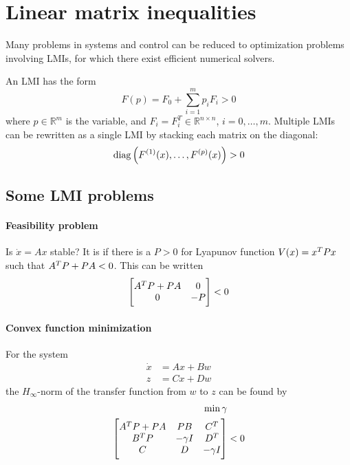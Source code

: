 \section{Linear matrix inequalities}
Many problems in systems and control can be reduced to optimization problems involving LMIs, for which there exist efficient numerical solvers.

An LMI has the form
%
\begin{equation}
  F(p) = F_0 + \sum_{i=1}^m p_i F_i > 0
\end{equation}
%
where $p \in \mathbb{R}^m$ is the variable, and $F_i = F_i^T \in \mathbb{R}^{n \times n}$, $i = 0, \dots, m$. Multiple LMIs can be rewritten as a single LMI by stacking each matrix on the diagonal:
%
\begin{equation}
  \operatorname{diag} \left( F^{(1)}(x), \dots, F^{(p)}(x) \right) > 0
\end{equation}

\subsection{Some LMI problems}
\paragraph{Feasibility problem} Is $\dot{x} = Ax$ stable? It is if there is a $P > 0$ for Lyapunov function $V(x) = x^{T} P x$ such that $A^{T} P + PA < 0$. This can be written
%
\begin{equation}
  \begin{bmatrix}
    A^{T} P + PA & 0 \\
    0 & -P
  \end{bmatrix}
  < 0
\end{equation}

\paragraph{Convex function minimization} For the system
%
\begin{equation}
  \begin{split}
    \dot{x} &= Ax + Bw \\
    z &= Cx + Dw
  \end{split}
\end{equation}
%
the $H_\infty$-norm of the transfer function from $w$ to $z$ can be found by
%
\begin{equation}
\begin{split}
  \min \gamma & \\
  \begin{bmatrix}
    A^{T} P + PA & PB & C^{T} \\
    B^{T} P & -\gamma I & D^{T} \\
    C & D & -\gamma I
  \end{bmatrix}
  & < 0
\end{split}
\end{equation}


